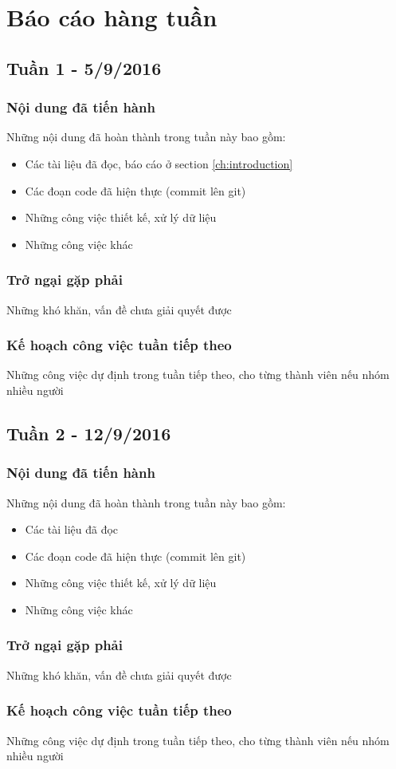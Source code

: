 \chapter*{Báo cáo hàng tuần}
\section{Tuần 1 - 5/9/2016}
\subsection{Nội dung đã tiến hành}
Những nội dung đã hoàn thành trong tuần này bao gồm:
\begin{itemize}
\item Các tài liệu đã đọc, báo cáo ở section \ref{ch:introduction}
\item Các đoạn code đã hiện thực (commit lên git)
\item Những công việc thiết kế, xử lý dữ liệu 
\item Những công việc khác
\end{itemize}

\subsection{Trở ngại gặp phải}
Những khó khăn, vấn đề chưa giải quyết được

\subsection{Kế hoạch công việc tuần tiếp theo}
Những công việc dự định trong tuần tiếp theo, cho từng thành viên nếu nhóm nhiều người


\section{Tuần 2 - 12/9/2016}
\subsection{Nội dung đã tiến hành}
Những nội dung đã hoàn thành trong tuần này bao gồm:
\begin{itemize}
\item Các tài liệu đã đọc 
\item Các đoạn code đã hiện thực (commit lên git)
\item Những công việc thiết kế, xử lý dữ liệu 
\item Những công việc khác
\end{itemize}

\subsection{Trở ngại gặp phải}
Những khó khăn, vấn đề chưa giải quyết được

\subsection{Kế hoạch công việc tuần tiếp theo}
Những công việc dự định trong tuần tiếp theo, cho từng thành viên nếu nhóm nhiều người

